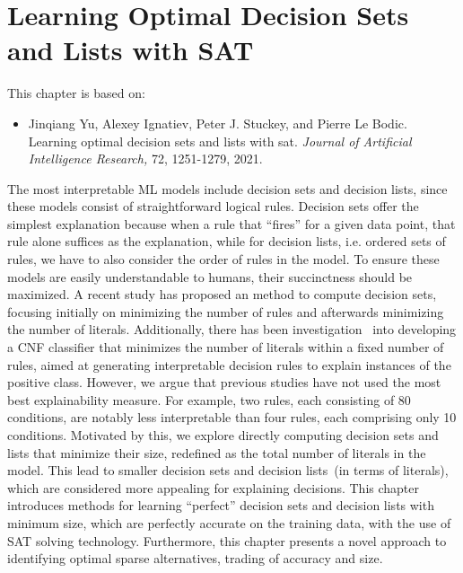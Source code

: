 \chapter{Learning Optimal Decision Sets and Lists with SAT}\label{chap:jair21}


This chapter is based on:
\begin{itemize}
	\item Jinqiang Yu, Alexey Ignatiev, Peter J. Stuckey, and Pierre Le Bodic. Learning optimal decision
sets and lists with sat. \emph{Journal of Artificial Intelligence Research,} 72, 1251-1279, 2021.
\end{itemize}

The most interpretable ML models include decision sets and decision lists,
since these models consist of straightforward logical rules.
%
Decision sets offer the simplest explanation because when a rule that ``fires'' for a given data
point, that rule alone suffices as the explanation, 
while for decision lists, i.e. ordered sets of rules, we have to also
consider the order of rules in the model.
%
To ensure these models are easily understandable to humans, 
their succinctness should be maximized.
%
A recent study has proposed an method to compute decision sets, focusing initially on minimizing the number of 
rules and afterwards minimizing the number of literals.
%
Additionally, there has been investigation~\cite{meel-cp18,meel-aies19}
into developing a CNF classifier 
that minimizes the number of literals within a fixed number of rules,
aimed at generating interpretable decision rules to explain instances of the positive class.
%
However, we argue that previous studies have not used the most best explainability measure.
%
For example, two rules, each consisting of 80 conditions, are notably less interpretable
than four rules, each comprising only 10 conditions.
%
Motivated by this, we explore directly computing decision sets and lists 
that minimize their size, redefined as the total number of literals in the model.
%
This lead to smaller decision sets and decision lists~(in terms of literals),
which are considered more appealing for explaining decisions.
%
This chapter introduces methods for learning ``perfect'' decision sets and decision lists with
minimum size, which are perfectly accurate on the training data, with the use of SAT solving technology.
%
Furthermore, this chapter presents a novel approach to identifying optimal sparse alternatives, 
trading of accuracy and size.



